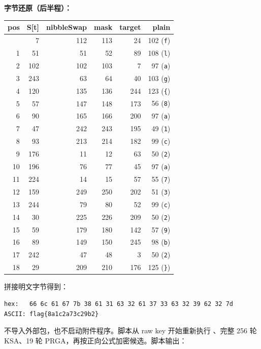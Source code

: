 \textbf{字节还原（后半程）：}

{\def\LTcaptype{} %
\begin{longtable}[]{@{}rrrrrr@{}}
\toprule\noalign{}
pos & S{[}t{]} & nibbleSwap & mask & target & plain \\
\midrule\noalign{}
\endhead
\bottomrule\noalign{}
\endlastfoot
0 & 7 & 112 & 113 & 24 & 102 (\texttt{f}) \\
1 & 51 & 51 & 52 & 89 & 108 (\texttt{l}) \\
2 & 102 & 102 & 103 & 7 & 97 (\texttt{a}) \\
3 & 243 & 63 & 64 & 40 & 103 (\texttt{g}) \\
4 & 120 & 135 & 136 & 244 & 123 (\texttt{\{}) \\
5 & 57 & 147 & 148 & 173 & 56 (\texttt{8}) \\
6 & 90 & 165 & 166 & 200 & 97 (\texttt{a}) \\
7 & 47 & 242 & 243 & 195 & 49 (\texttt{1}) \\
8 & 93 & 213 & 214 & 182 & 99 (\texttt{c}) \\
9 & 176 & 11 & 12 & 63 & 50 (\texttt{2}) \\
10 & 196 & 76 & 77 & 45 & 97 (\texttt{a}) \\
11 & 224 & 14 & 15 & 57 & 55 (\texttt{7}) \\
12 & 159 & 249 & 250 & 202 & 51 (\texttt{3}) \\
13 & 244 & 79 & 80 & 52 & 99 (\texttt{c}) \\
14 & 30 & 225 & 226 & 209 & 50 (\texttt{2}) \\
15 & 59 & 179 & 180 & 142 & 57 (\texttt{9}) \\
16 & 89 & 149 & 150 & 245 & 98 (\texttt{b}) \\
17 & 242 & 47 & 48 & 3 & 50 (\texttt{2}) \\
18 & 29 & 209 & 210 & 176 & 125 (\texttt{\}}) \\
\end{longtable}
}

拼接明文字节得到：

\begin{verbatim}
hex:   66 6c 61 67 7b 38 61 31 63 32 61 37 33 63 32 39 62 32 7d
ASCII: flag{8a1c2a73c29b2}
\end{verbatim}

\texttt{} 不导入外部包，也不启动附件程序。脚本从 raw key 开始重新执行 \texttt{}、完整 256 轮 KSA、19 轮 PRGA，再按正向公式加密候选。脚本输出：

